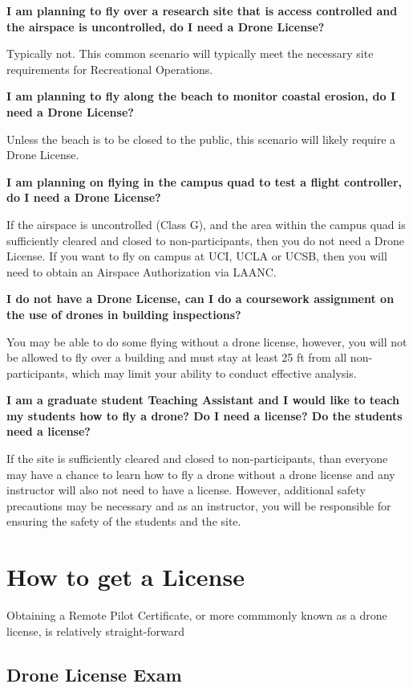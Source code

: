 \documentclass[
]{book}
\begin{document}
\textbf{I am planning to fly over a research site that is access controlled and the airspace is uncontrolled, do I need a Drone License?}

Typically not. This common scenario will typically meet the necessary site requirements for Recreational Operations.

\textbf{I am planning to fly along the beach to monitor coastal erosion, do I need a Drone License?}

Unless the beach is to be closed to the public, this scenario will likely require a Drone License.

\textbf{I am planning on flying in the campus quad to test a flight controller, do I need a Drone License?}

If the airspace is uncontrolled (Class G), and the area within the campus quad is sufficiently cleared and closed to non-participants, then you do not need a Drone License. If you want to fly on campus at UCI, UCLA or UCSB, then you will need to obtain an Airspace Authorization via LAANC.

\textbf{I do not have a Drone License, can I do a coursework assignment on the use of drones in building inspections?}

You may be able to do some flying without a drone license, however, you will not be allowed to fly over a building and must stay at least 25 ft from all non-participants, which may limit your ability to conduct effective analysis.

\textbf{I am a graduate student Teaching Assistant and I would like to teach my students how to fly a drone? Do I need a license? Do the students need a license?}

If the site is sufficiently cleared and closed to non-participants, than everyone may have a chance to learn how to fly a drone without a drone license and any instructor will also not need to have a license. However, additional safety precautions may be necessary and as an instructor, you will be responsible for ensuring the safety of the students and the site.

\hypertarget{ch-get-license}{%
\chapter{How to get a License}\label{ch-get-license}}

Obtaining a Remote Pilot Certificate, or more commmonly known as a drone license, is relatively straight-forward

\hypertarget{drone-license-exam}{%
\section{Drone License Exam}\label{drone-license-exam}}
\end{document}
